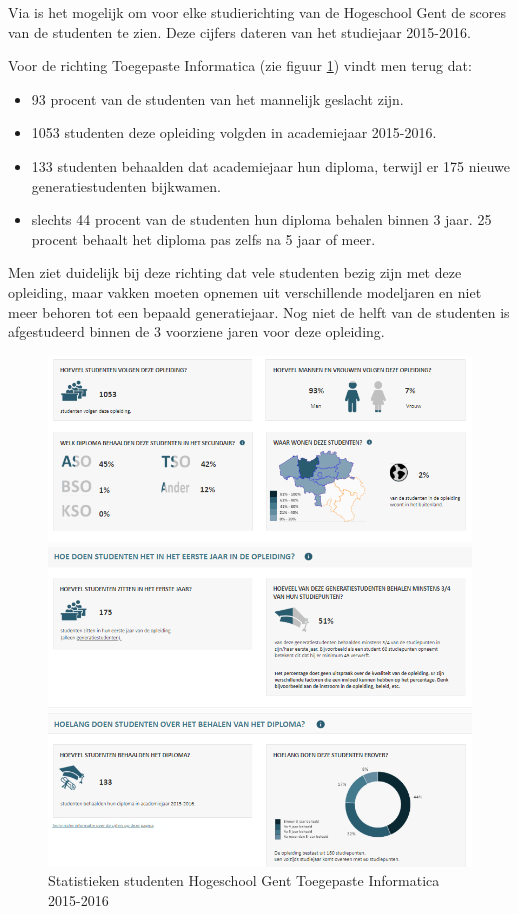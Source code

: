 Via \textcite{Onderwijs.vlaanderen.be2017} is het mogelijk om voor elke studierichting van de Hogeschool Gent de scores van de studenten te zien. Deze cijfers dateren van het studiejaar 2015-2016. 

Voor de richting Toegepaste Informatica (zie figuur \ref{fig:vlaanderenti}) vindt men terug dat:
\begin{itemize}
	\item 93 procent van de studenten van het mannelijk geslacht zijn.
	\item 1053 studenten deze opleiding volgden in academiejaar 2015-2016.
	\item 133 studenten behaalden dat academiejaar hun diploma, terwijl er 175 nieuwe generatiestudenten bijkwamen.
	\item slechts 44 procent van de studenten hun diploma behalen binnen 3 jaar. 25 procent behaalt het diploma pas zelfs na 5 jaar of meer.
\end{itemize}

Men ziet duidelijk bij deze richting dat vele studenten bezig zijn met deze opleiding, maar vakken moeten opnemen uit verschillende modeljaren en niet meer behoren tot een bepaald generatiejaar. Nog niet de helft van de studenten is afgestudeerd binnen de 3 voorziene jaren voor deze opleiding.

\begin{figure}
	\includegraphics[width=\textwidth]
	{img/vlaanderen_ti.png}
	\caption{Statistieken studenten Hogeschool Gent Toegepaste Informatica 2015-2016
	\autocite{Onderwijs.vlaanderen.be2017}}
	\label{fig:vlaanderenti}
\end{figure}

